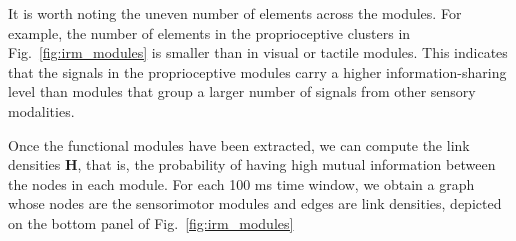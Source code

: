 It is worth noting the uneven number of elements across the modules. For example, the number of elements in the proprioceptive clusters in Fig.~\ref{fig:irm_modules} is smaller than in visual or tactile modules. This indicates that the signals in the proprioceptive modules carry a higher information-sharing level than modules that group a larger number of signals from other sensory modalities.

Once the functional modules have been extracted, we can compute the link densities $\bm{H}$, that is, the probability of having high mutual information between the nodes in each module. For each 100 ms time window, we obtain a graph whose nodes are the sensorimotor modules and edges are link densities, depicted on the bottom panel of Fig.~\ref{fig:irm_modules}

